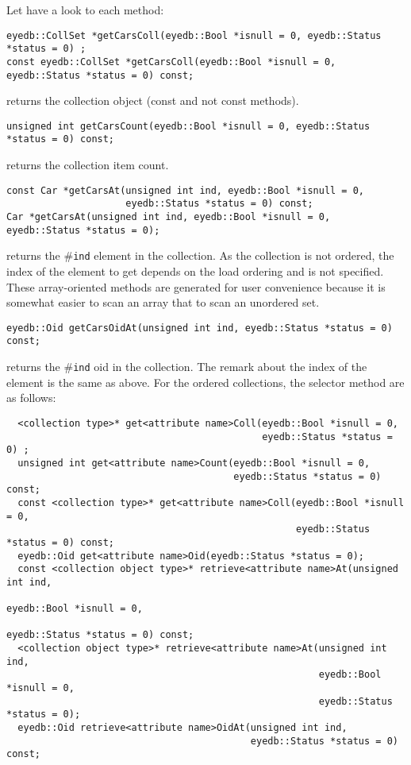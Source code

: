 \normalsize
Let have a look to each method:
\be
\item
\verbsize
\begin{verbatim}
eyedb::CollSet *getCarsColl(eyedb::Bool *isnull = 0, eyedb::Status *status = 0) ;
const eyedb::CollSet *getCarsColl(eyedb::Bool *isnull = 0, eyedb::Status *status = 0) const;
\end{verbatim}
\normalsize
returns the collection object (const and not const methods).
\item
\verbsize
\begin{verbatim}
unsigned int getCarsCount(eyedb::Bool *isnull = 0, eyedb::Status *status = 0) const;
\end{verbatim}
\normalsize
returns the collection item count.
\verbsize
\item
\verbsize
\begin{verbatim}
const Car *getCarsAt(unsigned int ind, eyedb::Bool *isnull = 0,
                     eyedb::Status *status = 0) const;
Car *getCarsAt(unsigned int ind, eyedb::Bool *isnull = 0, eyedb::Status *status = 0);
\end{verbatim}
\normalsize
returns the \#\texttt{ind} element in the collection. As the collection
is not ordered, the index of the element to get depends on the
load ordering and is not specified. These array-oriented methods
are generated for user convenience because it is somewhat easier to
scan an array that to scan an unordered set.
\item
\verbsize
\begin{verbatim}
eyedb::Oid getCarsOidAt(unsigned int ind, eyedb::Status *status = 0) const;
\end{verbatim}
\normalsize
returns the \#\texttt{ind} oid in the collection.
The remark about the index of the element is the same as above.
\ee
For the ordered collections, the selector method are as follows:
\verbsize
\begin{verbatim}
  <collection type>* get<attribute name>Coll(eyedb::Bool *isnull = 0,
                                             eyedb::Status *status = 0) ;
  unsigned int get<attribute name>Count(eyedb::Bool *isnull = 0,
                                        eyedb::Status *status = 0) const;
  const <collection type>* get<attribute name>Coll(eyedb::Bool *isnull = 0,
                                                   eyedb::Status *status = 0) const;
  eyedb::Oid get<attribute name>Oid(eyedb::Status *status = 0);
  const <collection object type>* retrieve<attribute name>At(unsigned int ind,
                                                             eyedb::Bool *isnull = 0,
                                                             eyedb::Status *status = 0) const;
  <collection object type>* retrieve<attribute name>At(unsigned int ind,
                                                       eyedb::Bool *isnull = 0,
                                                       eyedb::Status *status = 0);
  eyedb::Oid retrieve<attribute name>OidAt(unsigned int ind,
                                           eyedb::Status *status = 0) const;
\end{verbatim}

